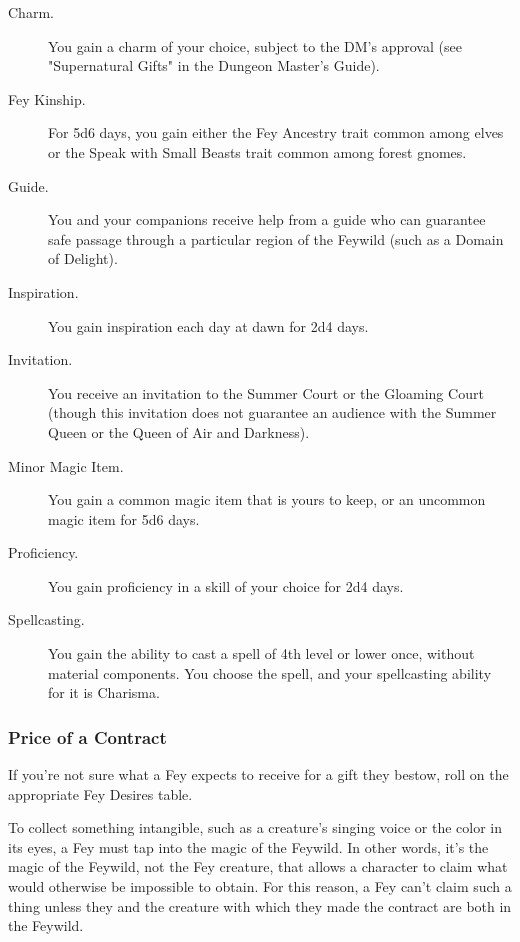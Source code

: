 \documentclass[10pt,a4paper,twoside,bg=print,twocolumn,openany,nodeprecatedcode]{dndbook}
\begin{document}
\begin{description}
\item[Charm.]
You gain a charm of your choice, subject to the DM's approval (see "Supernatural Gifts" in the Dungeon Master's Guide).
\item[Fey Kinship.]
For 5d6 days, you gain either the Fey Ancestry trait common among elves or the Speak with Small Beasts trait common among forest gnomes.
\item[Guide.]
You and your companions receive help from a guide who can guarantee safe passage through a particular region of the Feywild (such as a Domain of Delight).
\item[Inspiration.]
You gain inspiration each day at dawn for 2d4 days.
\item[Invitation.]
You receive an invitation to the Summer Court or the Gloaming Court (though this invitation does not guarantee an audience with the Summer Queen or the Queen of Air and Darkness).
\item[Minor Magic Item.]
You gain a common magic item that is yours to keep, or an uncommon magic item for 5d6 days.
\item[Proficiency.]
You gain proficiency in a skill of your choice for 2d4 days.
\item[Spellcasting.]
You gain the ability to cast a spell of 4th level or lower once, without material components. You choose the spell, and your spellcasting ability for it is Charisma.
\end{description}

\subsubsection{Price of a Contract}
If you're not sure what a Fey expects to receive for a gift they bestow, roll on the appropriate Fey Desires table.

To collect something intangible, such as a creature's singing voice or the color in its eyes, a Fey must tap into the magic of the Feywild. In other words, it's the magic of the Feywild, not the Fey creature, that allows a character to claim what would otherwise be impossible to obtain. For this reason, a Fey can't claim such a thing unless they and the creature with which they made the contract are both in the Feywild.
\end{document}
